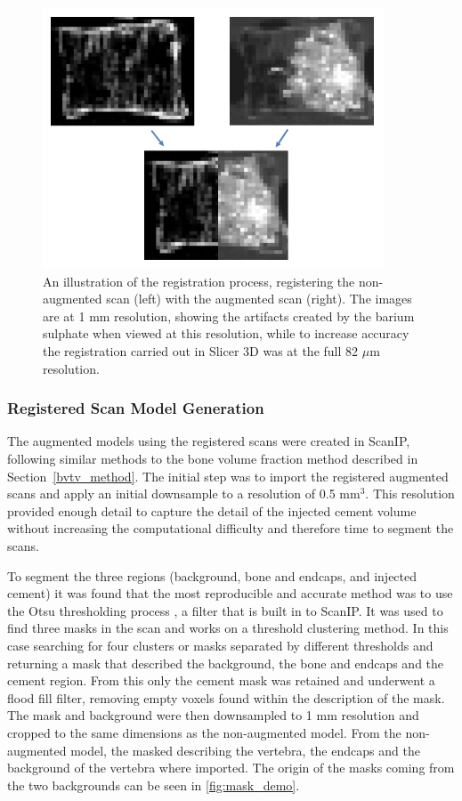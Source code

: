 \begin{figure}[ht!]
  \centering
  \includegraphics[width=4in]{Chapters/Chapter_HT_images/reg_demo.png}
  \caption{An illustration of the registration process, registering the non-augmented scan (left) with the augmented scan (right). The images are at 1 mm resolution, showing the artifacts created by the barium sulphate when viewed at this resolution, while to increase accuracy the registration carried out in Slicer 3D was at the full 82 $\mu$m resolution.}
  \label{fig:reg_demo}
\end{figure}

\subsubsection{Registered Scan Model Generation}

The augmented models using the registered scans were created in ScanIP, following similar methods to the bone volume fraction method described in Section~\ref{bvtv_method}.
The initial step was to import the registered augmented scans and apply an initial downsample to a resolution of 0.5 mm$^3$.
This resolution provided enough detail to capture the detail of the injected cement volume without increasing the computational difficulty and therefore time to segment the scans.

To segment the three regions (background, bone and endcaps, and injected cement) it was found that the most reproducible and accurate method was to use the Otsu thresholding process \cite{sezgin2004survey}, a filter that is built in to ScanIP\@.
It was used to find three masks in the scan and works on a threshold clustering method.
In this case searching for four clusters or masks separated by different thresholds and returning a mask that described the background, the bone and endcaps and the cement region.
From this only the cement mask was retained and underwent a flood fill filter, removing empty voxels found within the description of the mask.
The mask and background were then downsampled to 1 mm resolution and cropped to the same dimensions as the non-augmented model.
From the non-augmented model, the masked describing the vertebra, the endcaps and the background of the vertebra where imported.
The origin of the masks coming from the two backgrounds can be seen in \cref{fig:mask_demo}.

